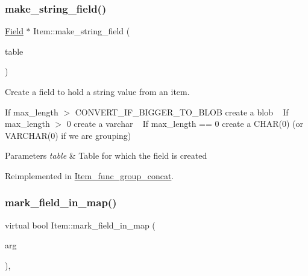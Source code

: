 \subsubsection{\texorpdfstring{make\+\_\+string\+\_\+field()}{make\_string\_field()}}
{\footnotesize\ttfamily \mbox{\hyperlink{classField}{Field}} $\ast$ Item\+::make\+\_\+string\+\_\+field (\begin{DoxyParamCaption}\item[{\mbox{\hyperlink{structTABLE}{T\+A\+B\+LE}} $\ast$}]{table }\end{DoxyParamCaption})\hspace{0.3cm}{\ttfamily [virtual]}}

Create a field to hold a string value from an item.

If max\+\_\+length $>$ C\+O\+N\+V\+E\+R\+T\+\_\+\+I\+F\+\_\+\+B\+I\+G\+G\+E\+R\+\_\+\+T\+O\+\_\+\+B\+L\+OB create a blob ~\newline
If max\+\_\+length $>$ 0 create a varchar ~\newline
If max\+\_\+length == 0 create a C\+H\+A\+R(0) (or V\+A\+R\+C\+H\+A\+R(0) if we are grouping)


\begin{DoxyParams}{Parameters}
{\em table} & Table for which the field is created \\
\hline
\end{DoxyParams}


Reimplemented in \mbox{\hyperlink{classItem__func__group__concat_ae472eb4f6eb3190f8baa326054acf9f8}{Item\+\_\+func\+\_\+group\+\_\+concat}}.

\mbox{\label{classItem_ada2ce79ccf5ef1273b9e1654448944c1}} 
\subsubsection{\texorpdfstring{mark\+\_\+field\+\_\+in\+\_\+map()}{mark\_field\_in\_map()}\hspace{0.1cm}{\footnotesize\ttfamily [1/2]}}
{\footnotesize\ttfamily virtual bool Item\+::mark\+\_\+field\+\_\+in\+\_\+map (\begin{DoxyParamCaption}\item[{uchar $\ast$}]{arg }\end{DoxyParamCaption})\hspace{0.3cm}{\ttfamily [inline]}, {\ttfamily [virtual]}}

